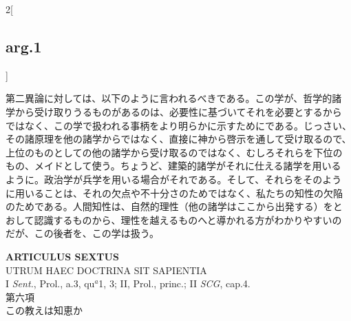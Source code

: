\documentclass[
paper=a4paper,
fontsize=10pt,
jafontsize=9pt,
titlepage
]{jlreq}
\begin{document}
\begin{paracol}{2}[\subsection{arg.1}]
\switchcolumn

第二異論に対しては、以下のように言われるべきである。この学が、哲学的諸
学から受け取りうるものがあるのは、必要性に基づいてそれを必要とするから
ではなく、この学で扱われる事柄をより明らかに示すためにである。じっさい、
その諸原理を他の諸学からではなく、直接に神から啓示を通して受け取るので、
上位のものとしての他の諸学から受け取るのではなく、むしろそれらを下位の
もの、メイドとして使う。ちょうど、建築的諸学がそれに仕える諸学を用いる
ように。政治学が兵学を用いる場合がそれである。そして、それらをそのよう
に用いることは、それの欠点や不十分さのためではなく、私たちの知性の欠陥
のためである。人間知性は、自然的理性（他の諸学はここから出発する）をと
おして認識するものから、理性を越えるものへと導かれる方がわかりやすいの
だが、この後者を、この学は扱う。

\end{paracol}
\newpage



{}
\setcounter{section}{6}
\setcounter{subsection}{0}
\begin{center}
 {\Large {\bfseries ARTICULUS SEXTUS}}\\
 {\large UTRUM HAEC DOCTRINA SIT SAPIENTIA}\\
 {\footnotesize I {\itshape Sent.}, Prol., a.3, qu$^a$1, 3; II, Prol.,
 princ.; II {\itshape SCG}, cap.4.}\\
 {\Large 第六項\\この教えは知恵か}
\end{center}
\end{document}
